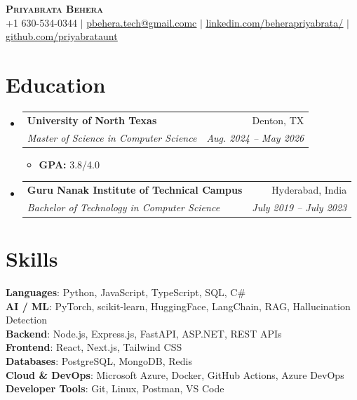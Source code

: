 \documentclass[letterpaper,10pt]{article}
\makeatletter
\newcommand{\resumeItem}[1]{
  \item\small{
    {#1 \vspace{-2pt}}
  }
}
\newcommand{\resumeSubheading}[4]{
  \vspace{-2pt}\item
    \begin{tabular*}{0.97\textwidth}[t]{l@{\extracolsep{\fill}}r}
      \textbf{#1} & #2 \\
      \textit{\small#3} & \textit{\small #4} \\
    \end{tabular*}\vspace{-7pt}
}
\newcommand{\resumeSubHeadingListStart}{\begin{itemize}[leftmargin=0.15in, label={}]}
\newcommand{\resumeSubHeadingListEnd}{\end{itemize}}
\newcommand{\resumeItemListStart}{\begin{itemize}}
\newcommand{\resumeItemListEnd}{\end{itemize}\vspace{-5pt}}
\makeatother
\begin{document}
\begin{center}
    \textbf{\Huge \scshape Priyabrata Behera} \\ \vspace{1pt}
    \small +1 630-534-0344 $|$ \href{mailto:priyabratabehera@my.unt.edu}{\underline{pbehera.tech@gmail.comc}} $|$ 
    \href{https://www.linkedin.com/in/beherapriyabrata/}{\underline{linkedin.com/beherapriyabrata/}} $|$
    \href{https://github.com/priyabrataunt}{\underline{github.com/priyabrataunt}}
\end{center}

\section{Education}
  \resumeSubHeadingListStart
    \resumeSubheading
      {University of North Texas}{Denton, TX}
      {Master of Science in Computer Science}{Aug. 2024 -- May 2026}
      \resumeItemListStart
        \resumeItem{\textbf{GPA:} 3.8/4.0}
      \resumeItemListEnd
    \resumeSubheading
  {Guru Nanak Institute of Technical Campus}{Hyderabad, India}
  {Bachelor of Technology in Computer Science}{July 2019 -- July 2023}
  \resumeSubHeadingListEnd

\section{Skills}
 \begin{itemize}[leftmargin=0.15in, label={}]
    \small{\item{
     \textbf{Languages}{: Python, JavaScript, TypeScript, SQL, C\#} \\
     \textbf{AI / ML}{: PyTorch, scikit-learn, HuggingFace, LangChain, RAG, Hallucination Detection} \\
     \textbf{Backend}{: Node.js, Express.js, FastAPI, ASP.NET, REST APIs} \\
     \textbf{Frontend}{: React, Next.js, Tailwind CSS} \\
     \textbf{Databases}{: PostgreSQL, MongoDB, Redis} \\
     \textbf{Cloud \& DevOps}{: Microsoft Azure, Docker, GitHub Actions, Azure DevOps} \\
     \textbf{Developer Tools}{: Git, Linux, Postman, VS Code}
    }}
 \end{itemize}
    
\end{document}
